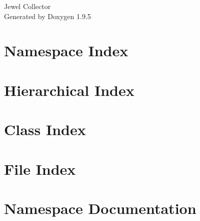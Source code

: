 \documentclass[twoside]{book}
\newcommand{\+}{\discretionary{\mbox{\scriptsize$\hookleftarrow$}}{}{}}
\newcommand{\clearemptydoublepage}{%
    \newpage{\pagestyle{empty}\cleardoublepage}%
  }
\begin{document}
  \raggedbottom
    \hypersetup{pageanchor=false,
                bookmarksnumbered=true,
                pdfencoding=unicode
               }
  \begin{titlepage}
  \vspace*{7cm}
  \begin{center}%
  {\Large Jewel Collector}\\
  \vspace*{1cm}
  {\large Generated by Doxygen 1.9.5}\\
  \end{center}
  \end{titlepage}
  \clearemptydoublepage
  \tableofcontents
  \clearemptydoublepage
  \hypersetup{pageanchor=true}
\chapter{Namespace Index}

\chapter{Hierarchical Index}

\chapter{Class Index}

\chapter{File Index}

\chapter{Namespace Documentation}








\end{document}
